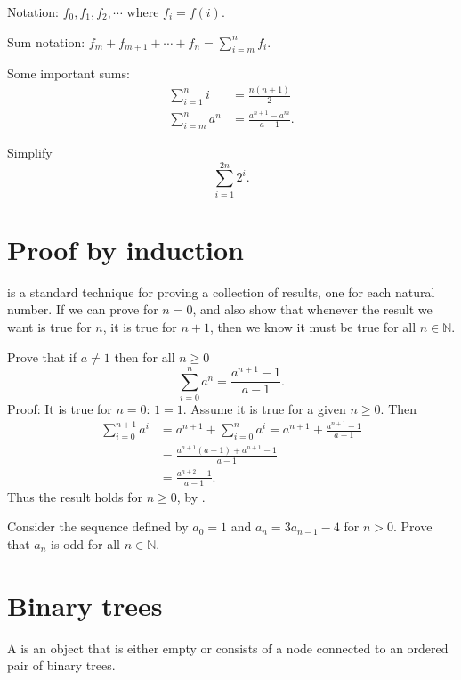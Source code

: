 Notation: $f_0, f_1, f_2, \cdots$ where $f_i = f(i)$.

Sum notation: $f_m+f_{m+1}+\cdots +f_n = \sum_{i=m}^n f_i$.

Some important sums: 
\begin{align*}
	\sum_{i=1}^n i & = \frac{n(n + 1)}{2} \\
	\sum_{i=m}^n a^n&  = \frac{a^{n+1} - a^m}{a - 1}.
\end{align*}

\begin{Boxample}[4]
Simplify $$\sum_{i=1}^{2n} 2^i\text{.}$$
\end{Boxample}


\section{Proof by induction}
 is a standard technique for proving a collection of results, one for each natural number. 
If we can prove for $n = 0$, and also show that whenever the result we want is true for $n$, it is true for $n+1$,
then we know it must be true for all $n \in \mathbb{N}$.

\begin{Boxample}
Prove that if $a\neq 1$ then for all  $n\geq 0$
$$
	\sum_{i=0}^n a^n = \frac{a^{n+1} - 1}{a - 1}.
$$
Proof: It is true for $n=0$: $1 = 1$. Assume it is true for a given  $n\geq 0$. Then
\begin{align*}
\sum_{i=0}^{n+1} a^i 
	& = a^{n+1} + \sum_{i=0}^n a^i = a^{n+1} + \frac{a^{n+1} - 1}{a - 1} \\
	& = \frac{a^{n+1} (a - 1) + a^{n+1} - 1}{a - 1}\\
	& = \frac{a^{n+2} - 1}{a - 1}.
\end{align*}
Thus the result holds for  $n \geq 0$, by .
\end{Boxample}

\begin{Boxample}[4]
Consider the sequence defined by $a_0 = 1$ and $a_n = 3a_{n-1} - 4$ for $n > 0$. Prove that $a_n$ is odd for all $n \in \mathbb{N}$.
\end{Boxample}


\section{Binary trees}
A  is an object that is either empty or consists of a  node connected to an ordered pair of binary trees. 
 
